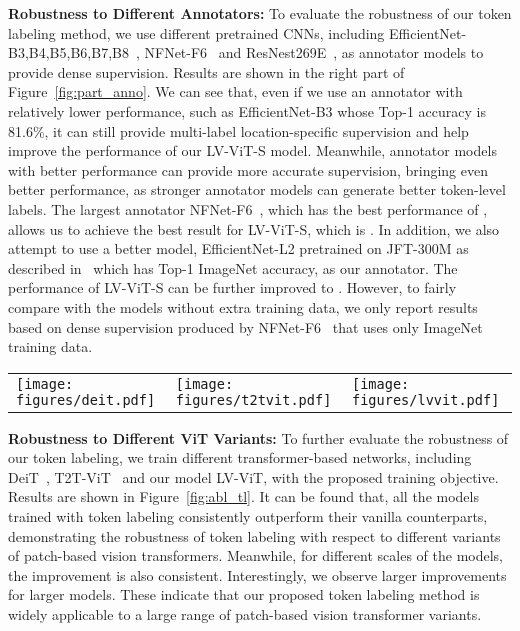 \documentclass{article}
\newcommand{\myPara}[1]{\noindent\textbf{#1:}}
\begin{document}
\myPara{Robustness to Different Annotators} 
To evaluate the robustness of our token labeling method, 
we use different pretrained CNNs, including EfficientNet-{B3,B4,B5,B6,B7,B8}~\cite{tan2019efficientnet}, NFNet-F6~\cite{brock2021high} and ResNest269E~\cite{zhang2020resnest}, as annotator models to provide dense supervision.
Results are shown in the right part of Figure~\ref{fig:part_anno}.
We can see that, even if we use an annotator with relatively lower performance, 
such as EfficientNet-B3 whose Top-1 accuracy is 81.6\%, it can still provide multi-label location-specific supervision and help improve the performance of our LV-ViT-S model.
Meanwhile, annotator models with better performance can provide more accurate supervision, bringing even better performance, as 
stronger annotator models can generate better token-level
labels.
The largest annotator NFNet-F6~\cite{brock2021high}, which has the best performance of , allows us to achieve the best result for LV-ViT-S, which is . 
In addition, we also attempt to use a better model, EfficientNet-L2 pretrained on JFT-300M as described in~\cite{yun2021relabel} which has  Top-1 ImageNet accuracy, as our annotator.
The performance of LV-ViT-S can be further improved to .
However, to fairly compare with the models without extra training data, we only report results based on dense supervision produced by NFNet-F6~\cite{brock2021high} 
that uses only ImageNet training data.


\begin{figure*}[h]
    \centering
    \small
    \begin{tabular}{lll}
    \texttt{[image: figures/deit.pdf]} &
    \texttt{[image: figures/t2tvit.pdf]} &
    \texttt{[image: figures/lvvit.pdf]}
    \end{tabular}
    \caption{Performance of the proposed token labeling objective on three different
    vision transformers: DeiT \cite{touvron2020training} (\textbf{Left}), T2T-ViT \cite{yuan2021tokens} (\textbf{Middle}), and LV-ViT (\textbf{Right}). Our method
    has a consistent improvement on all 7 different ViT models.}
    \label{fig:abl_tl}
\end{figure*}

\myPara{Robustness to Different ViT Variants} 
To further evaluate the robustness of our token labeling, we train different transformer-based networks, including DeiT~\cite{touvron2020training},
T2T-ViT~\cite{brock2021high} and our model LV-ViT, with the proposed training objective.
Results are shown in Figure~\ref{fig:abl_tl}. 
It can be found that, all the models trained with token labeling consistently outperform their vanilla counterparts, demonstrating the robustness of token labeling with respect to different variants of patch-based vision transformers.
Meanwhile, for different scales of the models, the improvement is also consistent.
Interestingly, we observe larger improvements for larger models.
These indicate that our proposed token labeling method is widely applicable to a large range of patch-based vision transformer variants.  
\end{document}
